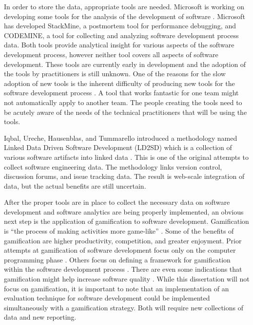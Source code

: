 \documentclass[SDSUThesis.tex]{subfiles}
\begin{document}
    In order to store the data, appropriate tools are needed.  Microsoft
    is working on developing some tools for the analysis of the development
    of software \cite{Czerwonka2013,Zhang2013}.  Microsoft has developed
    StackMine, a postmortem tool for performance debugging, and CODEMINE,
    a tool for collecting and analyzing software development process data.
    Both tools provide analytical insight for various aspects of the 
    software development process, however neither tool covers all aspects
    of software development.
    These tools are currently early in development and the adoption of the
    tools by practitioners is still unknown. One of the reasons for the slow
    adoption of new tools is the inherent difficulty of producing
    new tools for the software development process \cite{Spraragen2005}. A 
    tool that works fantastic for one team might not automatically apply to 
    another team.  The people creating the tools need to be acutely aware
    of the needs of the technical practitioners that will be using the
    tools.  
    
    Iqbal, Ureche, Hausenblas, and Tummarello introduced a methodology named
    Linked Data Driven Software Development (LD2SD) which is a collection
    of various software artifacts into linked data \cite{Iqbal2009}.  This
    is one of the original attempts to collect software engineering data.
    The methodology links version control, discussion forums, and issue tracking
    data. The result is web-scale integration of data, but the actual
    benefits are still uncertain. 

    After the proper tools are in place to collect the necessary
    data on software development and software analytics are being
    properly implemented, an obvious next step is the
    application of gamification to software development. Gamification
    is ``the process of making activities more game-like'' \cite{Werbach2014}.
    Some of the benefits of gamification are higher productivity, competition,
    and greater enjoyment.  
    Prior attempts
    at gamification of software development focus only on 
    the computer programming phase \cite{Snipes2013}. Others
    focus on defining a framework for gamification within
    the software development process \cite{Jain2013}. There are 
    even some indications that gamification might help increase
    software quality \cite{Dubois2013}. 
    While this dissertation will not focus on gamification, it is important to note
    that an implementation of an evaluation technique for software
    development could be implemented simultaneously with a gamification
    strategy. Both will require new collections of data and new reporting.
\end{document}

